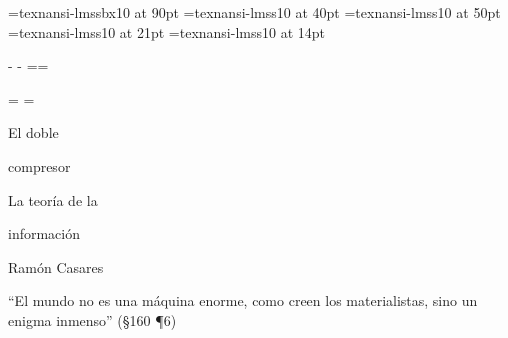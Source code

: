 
\font\titlefont=texnansi-lmssbx10 at 90pt
\font\subtitlefont=texnansi-lmss10 at 40pt
\font\authorfont=texnansi-lmss10 at 50pt
\font\citafont=texnansi-lmss10 at 21pt
\font\textfont=texnansi-lmss10 at 14pt

\ansifont

\def\pdfRed{\pdfliteral{0 1 1 0 k}}
\def\pdfBlack{\pdfliteral{0 0 0 1 k}}
\def\pdfWhite{\pdfliteral{0 0 0 0 k}}

\topskip=10bp
\newdimen\hpage
\hpage=6in \hsize=5.5in
 \hoffset\hpage \advance\hoffset-\hsize
 \divide{} \advance\hoffset-1in
\newdimen\vpage
\vpage=9in \vsize=8.5in
 \voffset\vpage \advance\voffset-\vsize
 \divide{} \advance\voffset-1in
\pdfpageheight=\vpage \pdfpagewidth=\hpage

\def\makeheadline{\vbox to0pt{\line{\the\headline}\vss}\nointerlineskip}

\headline={%
 \hfil}
\footline={\hfil}


\pdfWhite
\hbox{}
\vskip2.5in
\centerline{\titlefont El doble}
\vskip1pc
\centerline{\titlefont compresor}

\vskip10pc
\centerline{\subtitlefont La teoría de la}
\vskip6pt
\centerline{\subtitlefont información}

\vskip2pc
\centerline{\authorfont Ramón Casares}

\vfil\break


\pdfWhite

\begingroup\citafont\parindent=0pt\baselineskip=24pt\obeylines

``El mundo no es una máquina enorme,
\leavevmode\kern12pt como creen los materialistas,
\leavevmode\kern12pt sino un enigma inmenso'' {\textfont(§160 ¶6)}

\endgroup

\vskip 1pc

\begingroup\textfont\parindent=0pt\baselineskip=16pt\obeylines

